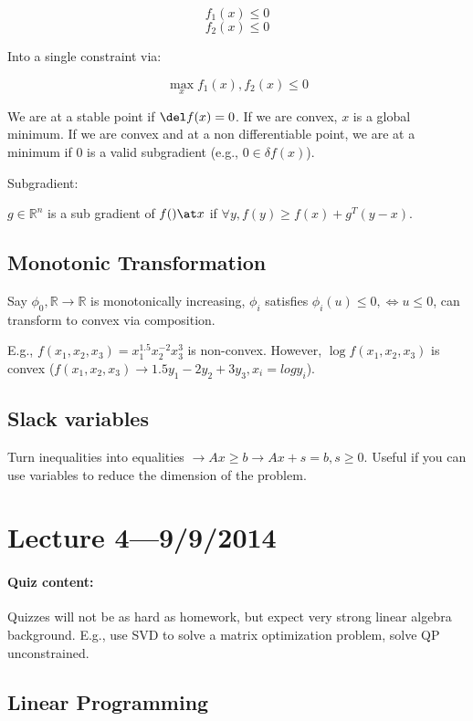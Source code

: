\documentclass[10pt]{article}
\begin{document}
$$
f_1(x) \le 0
$$
$$
f_2(x) \le 0
$$

Into a single constraint via:

$$
\max_x f_1(x), f_2(x) \le 0
$$

We are at a stable point if $\del f(x) = 0$. If we are convex, $x$ is a global minimum. If we are convex
and at a non differentiable point, we are at a minimum if 0 is a valid subgradient (e.g., $0 \in \delta
f(x)$).

Subgradient:

$g \in \mathbb{R}^n$ is a sub gradient of $f() \at x$ if $\forall y, f(y) \ge f(x) + g^T(y - x)$.

\subsection{Monotonic Transformation}

Say $\phi_0, \mathbb{R} \rightarrow \mathbb{R}$ is monotonically increasing, $\phi_i$ satisfies
$\phi_i(u) \le 0, \iff u \le 0$, can transform to convex via composition.

E.g., $f(x_1, x_2, x_3) = x^{1.5}_1 x_2^{-2} x_3^{3}$ is non-convex. However, $\log f(x_1, x_2, x_3)$ is
convex ($f(x_1, x_2, x_3) \rightarrow 1.5 y_1 - 2 y_2 + 3 y_3, x_i = log y_i$).

\subsection{Slack variables}

Turn inequalities into equalities $\rightarrow Ax \ge b \rightarrow Ax + s = b, s \ge 0$.
Useful if you can use variables to reduce the dimension of the problem.

\section{Lecture 4---9/9/2014}

\paragraph{Quiz content:} Quizzes will not be as hard as homework, but expect very strong
linear algebra background. E.g., use SVD to solve a matrix optimization problem, solve QP
unconstrained.

\subsection{Linear Programming}
\end{document}

